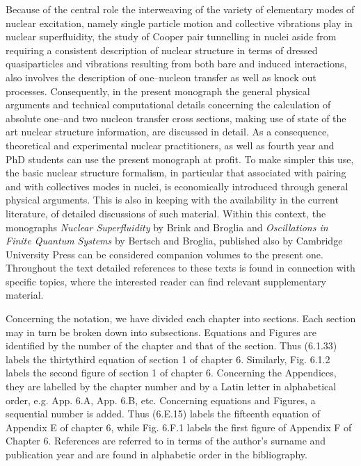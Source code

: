 Because of the central role the interweaving of the variety of elementary modes of nuclear excitation, namely single particle motion and collective vibrations play in nuclear superfluidity, the study of Cooper pair tunnelling in nuclei aside from requiring a consistent description of nuclear structure in terms of dressed quasiparticles and vibrations resulting from both bare and induced interactions, also involves  the description of one--nucleon transfer as well as knock out processes. Consequently, in the present monograph the general physical arguments and technical computational details concerning the   calculation of  absolute one--and two nucleon  transfer cross sections, making use of state of the art nuclear structure information, are discussed in detail. As a consequence, theoretical and experimental nuclear practitioners, as well as fourth year and PhD students can use the present monograph at profit. To make simpler this use, the basic nuclear structure formalism, in particular that associated with pairing and with collectives modes in nuclei, is economically introduced through general physical arguments. This is also in keeping with the availability in the current literature, of detailed discussions of such material. Within this context, the monographs \emph{Nuclear Superfluidity} by Brink and Broglia and \emph{Oscillations in Finite Quantum Systems}  by Bertsch and Broglia, published also by Cambridge University Press can be considered companion volumes to the present one. Throughout the text detailed references to these texts is found in connection with specific topics, where the interested reader can find relevant supplementary material.


Concerning the notation, we have divided each chapter into sections. Each section may in turn be broken down into subsections. Equations and Figures are identified by the number of the chapter and that of the section. Thus (6.1.33) labels the thirtythird equation of section 1 of chapter 6. Similarly, Fig. 6.1.2 labels the second figure of section 1 of chapter 6. Concerning the Appendices, they are labelled by the chapter number and by a Latin letter in alphabetical order, e.g. App. 6.A, App. 6.B, etc. Concerning equations and Figures, a sequential number is added. Thus (6.E.15) labels the fifteenth equation of Appendix E of chapter 6, while Fig. 6.F.1 labels the first figure of Appendix F of Chapter 6. References are referred to in terms of the author's surname and publication year and are found in alphabetic order in the bibliography.

